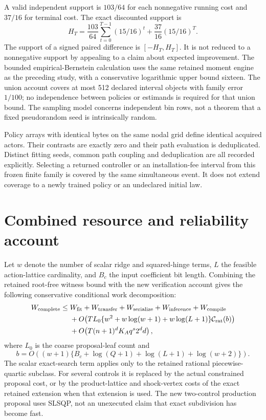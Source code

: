 A valid independent support is $103/64$ for each nonnegative running cost and $37/16$ for terminal cost. The exact discounted support is
\[
 H_T=\frac{103}{64}\sum_{t=0}^{T-1}(15/16)^t
                    +\frac{37}{16}(15/16)^T.
\]
The support of a signed paired difference is $[-H_T,H_T]$. It is not reduced to a nonnegative support by appealing to a claim about expected improvement. The bounded empirical-Bernstein calculation uses the same retained moment engine as the preceding study, with a conservative logarithmic upper bound sixteen. The union account covers at most 512 declared interval objects with family error $1/100$; no independence between policies or estimands is required for that union bound. The sampling model concerns independent bin rows, not a theorem that a fixed pseudorandom seed is intrinsically random.

Policy arrays with identical bytes on the same nodal grid define identical acquired actors. Their contrasts are exactly zero and their path evaluation is deduplicated. Distinct fitting seeds, common path coupling and deduplication are all recorded explicitly. Selecting a returned controller or an installation-fee interval from this frozen finite family is covered by the same simultaneous event. It does not extend coverage to a newly trained policy or an undeclared initial law.




\section{Combined resource and reliability account}\label{supp:resources62}
Let $w$ denote the number of scalar ridge and squared-hinge terms, $L$ the feasible action-lattice cardinality, and $B_c$ the input coefficient bit length. Combining the retained root-free witness bound with the new verification account gives the following conservative conditional work decomposition:
\begin{align*}
 W_{\rm complete}\le {}&W_{\rm fit}+W_{\rm transfer}+W_{\rm serialize}
                       +W_{\rm inference}+W_{\rm compile}\\
 &+O\!\left(TL_0\{w^2+w\log(w+1)+w\log(L+1)\}
                      \mathcal C_{\rm rat}(b)\right)\\
 &+O\!\left(T(n+1)^dK_Aq^s2^d d\right),
\end{align*}
where $L_0$ is the coarse proposal-leaf count and
\[
 b=O\!\left((w+1)\{B_c+\log(Q+1)+\log(L+1)+\log(w+2)\}\right).
\]
The scalar exact-search term applies only to the retained rational piecewise-quartic subclass. For several controls it is replaced by the actual constrained proposal cost, or by the product-lattice and shock-vertex costs of the exact retained extension when that extension is used. The new two-control production proposal uses SLSQP, not an unexecuted claim that exact subdivision has become fast.


